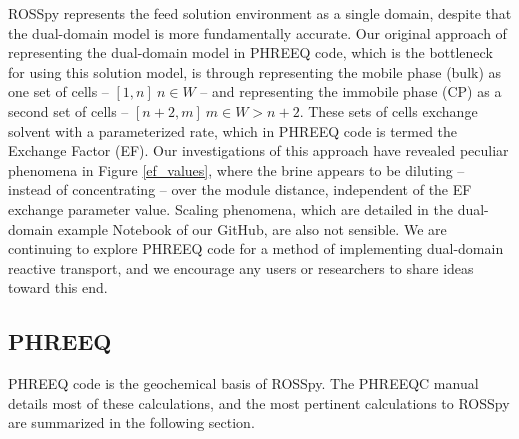 ROSSpy represents the feed solution environment as a single domain, despite that the dual-domain model is more fundamentally accurate. Our original approach of representing the dual-domain model in PHREEQ code, which is the bottleneck for using this solution model, is through representing the mobile phase (bulk) as  one set of cells -- $[1,n]~n\in W$ -- and representing the immobile phase (CP) as a second set of cells -- $[n+2,m]~m \in W>n+2$. These sets of cells exchange solvent with a parameterized rate, which in PHREEQ code is termed the Exchange Factor (EF). Our investigations of this approach have revealed peculiar phenomena in Figure \ref{ef_values}, where the brine appears to be diluting -- instead of concentrating -- over the module distance, independent of the EF exchange parameter value. Scaling phenomena, which are detailed in the dual-domain example Notebook of our GitHub, are also not sensible. We are continuing to explore PHREEQ code for a method of implementing dual-domain reactive transport, and we encourage any users or researchers to share ideas toward this end.

\subsection{PHREEQ}
PHREEQ code is the geochemical basis of ROSSpy. The PHREEQC manual details most of these calculations, and the most pertinent calculations to ROSSpy are summarized in the following section.


